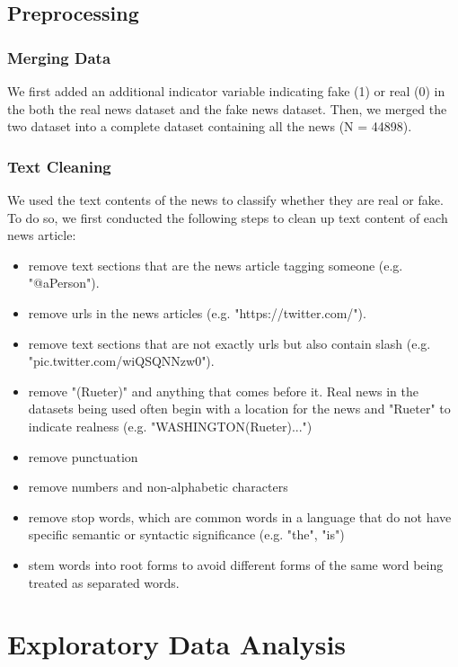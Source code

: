 \documentclass{article}
\begin{document}
\begin{multicols}{2}
\subsection{Preprocessing}

\subsubsection{Merging Data}
We first added an additional indicator variable indicating fake (1) or real (0) in the both the real news dataset and the fake news dataset. Then, we merged the two dataset into a complete dataset containing all the news (N = 44898). 

\subsubsection{Text Cleaning}
We used the text contents of the news to classify whether they are real or fake. To do so, we first conducted the following steps to clean up text content of each news article:
\begin{itemize}
  \item remove text sections that are the news article tagging someone (e.g. "@aPerson").
  \item remove urls in the news articles (e.g. "https://twitter.com/").
  \item remove text sections that are not exactly urls but also contain slash (e.g. "pic.twitter.com/wiQSQNNzw0").
  \item remove "(Rueter)" and anything that comes before it. Real news in the datasets being used often begin with a location for the news and "Rueter" to indicate realness (e.g. "WASHINGTON(Rueter)...")
  \item remove punctuation
  \item remove numbers and non-alphabetic characters
  \item remove stop words, which are common words in a language that do not have specific semantic or syntactic significance (e.g. "the", "is")
  \item stem words into root forms to avoid different forms of the same word being treated as separated words.
 
\end{itemize}



\section{Exploratory Data Analysis}


\end{multicols}
\end{document}
